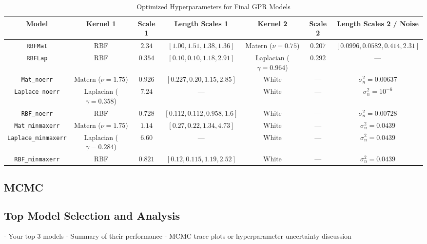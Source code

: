 \documentclass{article}
\begin{document}
\begin{table}[H]
\centering
\footnotesize  %
\renewcommand{\arraystretch}{1.15}  %
\setlength{\tabcolsep}{4pt}  %
\caption{Optimized Hyperparameters for Final GPR Models}
\label{tab:final_gpr_hyperparams}
\begin{tabular}{|c|c|c|c|c|c|c|}
\hline
\textbf{Model} & \textbf{Kernel 1} & \textbf{Scale 1} & \textbf{Length Scales 1} & \textbf{Kernel 2} & \textbf{Scale 2} & \textbf{Length Scales 2 / Noise} \\
\hline
\texttt{RBFMat} & RBF & $2.34$ & $[1.00, 1.51, 1.38, 1.36]$ & Matern ($\nu = 0.75$) & $0.207$ & $[0.0996, 0.0582, 0.414, 2.31]$ \\
\texttt{RBFLap} & RBF & $0.354$ & $[0.10, 0.10, 1.18, 2.91]$ & Laplacian ($\gamma = 0.964$) & $0.292$ & --- \\
\texttt{Mat\_noerr} & Matern ($\nu = 1.75$) & $0.926$ & $[0.227, 0.20, 1.15, 2.85]$ & White & --- & $\sigma_n^2 = 0.00637$ \\
\texttt{Laplace\_noerr} & Laplacian ($\gamma = 0.358$) & $7.24$ & --- & White & --- & $\sigma_n^2 = 10^{-6}$ \\
\texttt{RBF\_noerr} & RBF & $0.728$ & $[0.112, 0.112, 0.958, 1.6]$ & White & --- & $\sigma_n^2 = 0.00728$ \\
\texttt{Mat\_minmaxerr} & Matern ($\nu = 1.75$) & $1.14$ & $[0.27, 0.22, 1.34, 4.73]$ & White & --- & $\sigma_n^2 = 0.0439$ \\
\texttt{Laplace\_minmaxerr} & Laplacian ($\gamma = 0.284$) & $6.60$ & --- & White & --- & $\sigma_n^2 = 0.0439$ \\
\texttt{RBF\_minmaxerr} & RBF & $0.821$ & $[0.12, 0.115, 1.19, 2.52]$ & White & --- & $\sigma_n^2 = 0.0439$ \\
\hline
\end{tabular}
\end{table}


\subsection*{MCMC}

    

    
        
    



\subsection{Top Model Selection and Analysis}
- Your top 3 models
- Summary of their performance
- MCMC trace plots or hyperparameter uncertainty discussion
\end{document}
